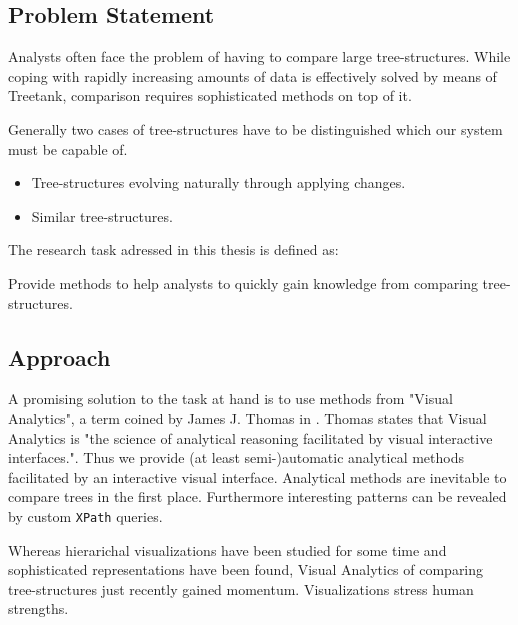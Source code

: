 \subsection{Problem Statement}\label{subsec::problem}
Analysts often face the problem of having to compare large tree-structures. While coping with rapidly increasing amounts of data is effectively solved by means of Treetank, comparison requires sophisticated methods on top of it. 

Generally two cases of tree-structures have to be distinguished which our system must be capable of.

\begin{itemize}
\item Tree-structures evolving naturally through applying changes.
\item Similar tree-structures.
\end{itemize}

The research task adressed in this thesis is defined as:

\begin{mydef}
Provide methods to help analysts to quickly gain knowledge from comparing tree-structures.
\end{mydef}

\subsection{Approach}
A promising solution to the task at hand is to use methods from "Visual Analytics", a term coined by James J. Thomas in \cite{VISUAL_ANALYTICS}. Thomas states that Visual Analytics is "the science of analytical reasoning facilitated by visual interactive interfaces.". Thus we provide (at least semi-)automatic analytical methods facilitated by an interactive visual interface. Analytical methods are inevitable to compare trees in the first place. Furthermore interesting patterns can be revealed by custom \texttt{XPath} queries.

Whereas hierarichal visualizations have been studied for some time and sophisticated representations have been found, Visual Analytics of comparing tree-structures just recently gained momentum. Visualizations stress human strengths.

